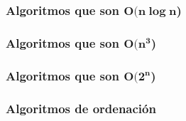 \documentclass[11pt]{article}
\begin{document}
\begin{center}
	
\end{center}

\begin{center}
	
\end{center}


\subsubsection*{Algoritmos que son $\boldsymbol{O(n\log n}$)}


\begin{center}
	
\end{center}


\begin{center}
	
\end{center}


\begin{center}
	
\end{center}

\begin{center}
	
\end{center}

\subsubsection*{Algoritmos que son $\boldsymbol{O(n^3}$)}

\begin{center}
	
\end{center}


\subsubsection*{Algoritmos que son $\boldsymbol{O(2^n}$)}


\begin{center}
	
\end{center}


\subsubsection*{Algoritmos de ordenación}

\begin{adjustbox}{center}
	
\end{adjustbox}
\end{document}
